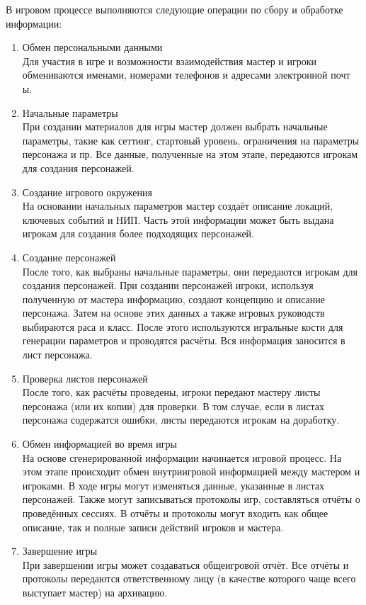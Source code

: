 
В игровом процессе выполняются следующие операции по сбору и обработке информации:
\begin{enumerate}
\item Обмен персональными данными\\
Для участия в игре и возможности взаимодействия мастер и игроки обмениваются именами, номерами телефонов и адресами электронной почт
ы.
\item Начальные параметры\\
При создании материалов для игры мастер должен выбрать начальные параметры, такие как сеттинг, стартовый уровень, ограничения на параметры персонажа и пр. Все данные, полученные на этом этапе, передаются игрокам для создания персонажей.

\item Создание игрового окружения\\
На основании начальных параметров мастер создаёт описание локаций, ключевых событий и НИП. Часть этой информации может быть выдана игрокам для создания более подходящих персонажей.
\item Создание персонажей\\
После того, как выбраны начальные параметры, они передаются игрокам для создания персонажей. При создании персонажей игроки, используя полученную от мастера информацию, создают концепцию и описание персонажа. Затем на основе этих данных а также игровых руководств выбираются раса и класс. После этого используются игральные кости для генерации параметров и проводятся расчёты. Вся информация заносится в лист персонажа.
\item Проверка листов персонажей\\
После того, как расчёты проведены, игроки передают мастеру листы персонажа (или их копии) для проверки. В том случае, если в листах персонажа содержатся ошибки, листы передаются игрокам на доработку.
\item Обмен информацией во время игры\\
На основе сгенерированной информации начинается игровой процесс. На этом этапе происходит обмен внутриигровой информацией между мастером и игроками. В ходе игры могут изменяться данные, указанные в листах персонажей. Также могут записываться протоколы игр, составляться отчёты о проведённых сессиях. В отчёты и протоколы могут входить как общее описание, так и полные записи действий игроков и мастера.
\item Завершение игры\\
При завершении игры может создаваться общеигровой отчёт. Все отчёты и протоколы передаются ответственному лицу (в качестве которого чаще всего выступает мастер) на архивацию.
\end{enumerate}


